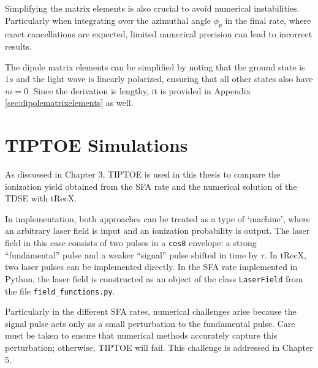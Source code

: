 Simplifying the matrix elements is also crucial to avoid numerical instabilities. 
Particularly when integrating over the azimuthal angle $\phi_p$ in the final rate, where exact cancellations are expected, limited numerical precision can lead to incorrect results.

The dipole matrix elements can be simplified by noting that the ground state is $1s$ and the light wave is linearly polarized, ensuring that all other states also have $m=0$. Since the derivation is lengthy, it is provided in Appendix \ref{sec:dipolematrixelements} as well.

\section{TIPTOE Simulations}
As discussed in Chapter 3, TIPTOE is used in this thesis to compare the ionization yield obtained from the SFA rate and the numerical solution of the TDSE with tRecX.

In implementation, both approaches can be treated as a type of `machine', where an arbitrary laser field is input and an ionization probability is output. The laser field in this case consists of two pulses in a \texttt{cos8} envelope: a strong ``fundamental'' pulse and a weaker ``signal'' pulse shifted in time by $\tau$. 
In tRecX, two laser pulses can be implemented directly. In the SFA rate implemented in Python, the laser field is constructed as an object of the class \texttt{LaserField} from the file \texttt{field\_functions.py}.

Particularly in the different SFA rates, numerical challenges arise because the signal pulse acts only as a small perturbation to the fundamental pulse. Care must be taken to ensure that numerical methods accurately capture this perturbation; otherwise, TIPTOE will fail. This challenge is addressed in Chapter 5.